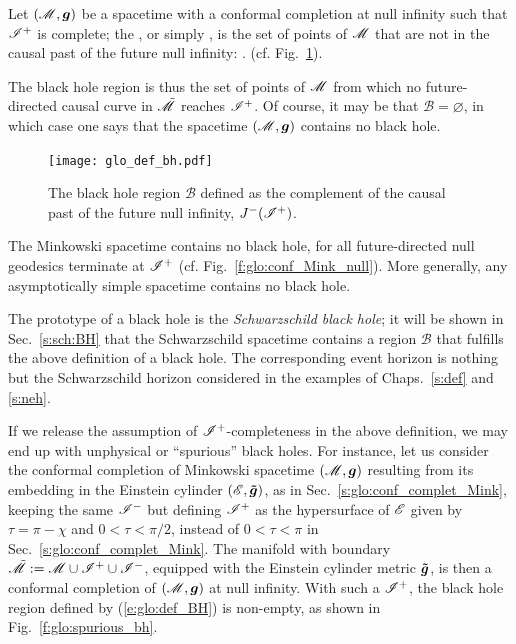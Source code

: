 \begin{greybox}
Let $(\mathscr{M},\bm{g})$ be a spacetime with a conformal completion at null infinity
such that $\mathscr{I}^+$ is complete;
the , or simply ,
is the set of points of $\mathscr{M}$ that are not in the causal past of the future null infinity:
\be \label{e:glo:def_BH}
     .
\ee
(cf. Fig.~\ref{f:glo:def_bh}).
\end{greybox}
The black hole region is thus the set of points of $\mathscr{M}$
from which no future-directed causal curve in $\tilde{\mathscr{M}}$ reaches $\mathscr{I}^+$.
Of course, it may be that $\mathscr{B} = \varnothing$, in which case one
says that the spacetime $(\mathscr{M},\bm{g})$ contains no black hole.


\begin{figure}
\centerline{\texttt{[image: glo\_def\_bh.pdf]}}
\caption[]{\label{f:glo:def_bh} \footnotesize
The black hole region $\mathscr{B}$ defined as the complement of
the causal past of the future null infinity, $J^-(\mathscr{I}^+)$.}
\end{figure}


\begin{example}
The Minkowski spacetime contains no black hole, for all future-directed null geodesics
terminate at $\mathscr{I}^+$ (cf. Fig.~\ref{f:glo:conf_Mink_null}).
More generally, any asymptotically simple spacetime contains no black hole.
\end{example}

\begin{example}
The prototype of a black hole is the \emph{Schwarzschild black hole}; it will
be shown in Sec.~\ref{s:sch:BH} that the Schwarzschild spacetime contains
a region $\mathscr{B}$ that fulfills the above definition of a black hole.
The corresponding event horizon is nothing but the
Schwarzschild horizon considered in the examples
of Chaps.~\ref{s:def} and \ref{s:neh}.
\end{example}

\begin{remark} \label{s:glo:spurious_bh}
If we release the assumption of $\mathscr{I}^+$-completeness in the above definition,
we may end up with unphysical or ``spurious'' black holes.
For instance, let us consider the conformal completion of Minkowski spacetime
$(\mathscr{M},\bm{g})$ resulting from its embedding in the Einstein cylinder
$(\mathscr{E},\bm{\tilde{g}})$, as in
Sec.~\ref{s:glo:conf_complet_Mink},
keeping the same $\mathscr{I}^-$ but
defining $\mathscr{I}^+$ as the
hypersurface of $\mathscr{E}$ given by $\tau = \pi - \chi$
and $0<\tau<\pi/2$, instead of  $0<\tau<\pi$ in Sec.~\ref{s:glo:conf_complet_Mink}.
The manifold with boundary $\tilde{\mathscr{M}} := \mathscr{M} \cup \mathscr{I}^+ \cup \mathscr{I}^-$,
equipped with the Einstein cylinder metric $\bm{\tilde g}$, is then a conformal completion
of $(\mathscr{M},\bm{g})$ at null infinity. With such a $\mathscr{I}^+$, the black hole region
defined by (\ref{e:glo:def_BH}) is non-empty, as shown in Fig.~\ref{f:glo:spurious_bh}.
\end{remark}

